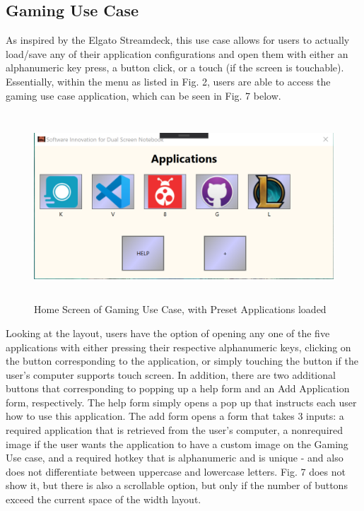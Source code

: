 \documentclass[fullpage, 10pt, onecolumn, draftclsnofoot]{IEEEtran}
\begin{document}
\subsection{Gaming Use Case}
As inspired by the Elgato Streamdeck, this use case allows for users to actually load/save any of their application configurations and open them with either an alphanumeric key press, a button click, or a touch (if the screen is touchable).  Essentially, within the menu as listed in Fig. 2, users are able to access the gaming use case application, which can be seen in Fig. 7 below.\\

\begin{figure}[H]
    \centering
    \includegraphics[height=7cm, width=14cm]{images/gamingHomeScreen.PNG}
    \caption{Home Screen of Gaming Use Case, with Preset Applications loaded}
    \label{fig:my_label}
\end{figure}

Looking at the layout, users have the option of opening any one of the five applications with either pressing their respective alphanumeric keys, clicking on the button corresponding to the application, or simply touching the button if the user's computer supports touch screen.  In addition, there are two additional buttons that corresponding to popping up a help form and an Add Application form, respectively.  The help form simply opens a pop up that instructs each user how to use this application.  The add form opens a form that takes 3 inputs: a required application that is retrieved from the user's computer, a nonrequired image if the user wants the application to have a custom image on the Gaming Use case, and a required hotkey that is alphanumeric and is unique - and also does not differentiate between uppercase and lowercase letters.  Fig. 7 does not show it, but there is also a scrollable option, but only if the number of buttons exceed the current space of the width layout. \\
\end{document}
